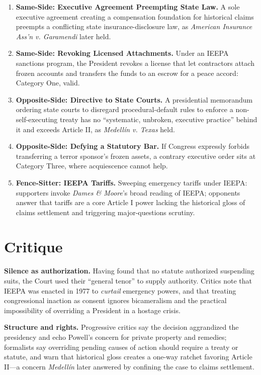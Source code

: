 \documentclass[12pt]{article}
\begin{document}
\begin{enumerate}
\item \textbf{Same-Side: Executive Agreement Preempting State Law.} A sole executive agreement creating a compensation foundation for historical claims preempts a conflicting state insurance-disclosure law, as \textit{American Insurance Ass'n v. Garamendi} later held.
\item \textbf{Same-Side: Revoking Licensed Attachments.} Under an IEEPA sanctions program, the President revokes a license that let contractors attach frozen accounts and transfers the funds to an escrow for a peace accord: Category One, valid.
\item \textbf{Opposite-Side: Directive to State Courts.} A presidential memorandum ordering state courts to disregard procedural-default rules to enforce a non-self-executing treaty has no ``systematic, unbroken, executive practice'' behind it and exceeds Article II, as \textit{Medell\'in v. Texas} held.
\item \textbf{Opposite-Side: Defying a Statutory Bar.} If Congress expressly forbids transferring a terror sponsor's frozen assets, a contrary executive order sits at Category Three, where acquiescence cannot help.
\item \textbf{Fence-Sitter: IEEPA Tariffs.} Sweeping emergency tariffs under IEEPA: supporters invoke \textit{Dames \& Moore}'s broad reading of IEEPA; opponents answer that tariffs are a core Article I power lacking the historical gloss of claims settlement and triggering major-questions scrutiny.
\end{enumerate}

\section{Critique}

\textbf{Silence as authorization.} Having found that no statute authorized suspending suits, the Court used their ``general tenor'' to supply authority. Critics note that IEEPA was enacted in 1977 to \textit{curtail} emergency powers, and that treating congressional inaction as consent ignores bicameralism and the practical impossibility of overriding a President in a hostage crisis.

\textbf{Structure and rights.} Progressive critics say the decision aggrandized the presidency and echo Powell's concern for private property and remedies; formalists say overriding pending causes of action should require a treaty or statute, and warn that historical gloss creates a one-way ratchet favoring Article II---a concern \textit{Medell\'in} later answered by confining the case to claims settlement.
\end{document}
